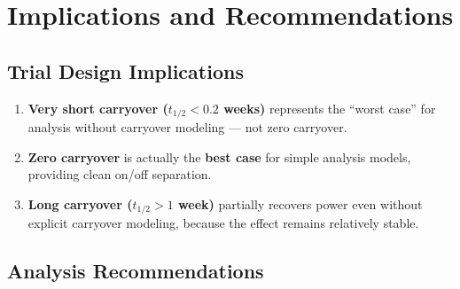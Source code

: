 \documentclass[11pt,a4paper]{article}
\begin{document}
\section{Implications and Recommendations}

\subsection{Trial Design Implications}

\begin{enumerate}
    \item \textbf{Very short carryover ($t_{1/2} < 0.2$ weeks)} represents the ``worst case'' for
          analysis without carryover modeling --- not zero carryover.

    \item \textbf{Zero carryover} is actually the \textbf{best case} for simple analysis models,
          providing clean on/off separation.

    \item \textbf{Long carryover ($t_{1/2} > 1$ week)} partially recovers power even without
          explicit carryover modeling, because the effect remains relatively stable.
\end{enumerate}

\subsection{Analysis Recommendations}
\end{document}
